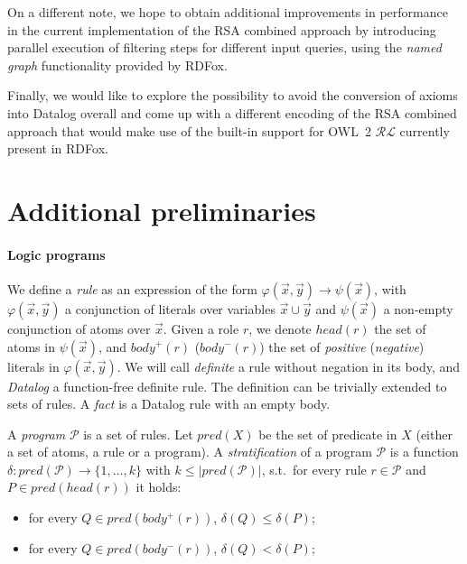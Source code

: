 \documentclass[runningheads]{llncs}
\newcommand{\rdfox}{\mbox{RDFox}\xspace}
\newcommand{\datalog}{\mbox{Datalog}\xspace}
\begin{document}
On a different note, we hope to obtain additional improvements in performance in the current implementation of the RSA combined approach by introducing parallel execution of filtering steps for different input queries, using the \emph{named graph} functionality provided by \rdfox.

Finally, we would like to explore the possibility to avoid the conversion of axioms into \datalog overall and come up with a different encoding of the RSA combined approach that would make use of the built-in support for OWL~2 $\mathcal{RL}$ currently present in \rdfox.
 




\appendix
\appendixpage

\section{Additional preliminaries}\label{apx:additional_preliminaries}
 
\paragraph*{Logic programs}

We define a \emph{rule} as an expression of the form $\varphi(\vec{x},\vec{y}) \rightarrow \psi(\vec{x})$, with $\varphi(\vec{x},\vec{y})$ a conjunction of literals over variables $\vec{x} \cup \vec{y}$ and $\psi(\vec{x})$ a non-empty conjunction of atoms over $\vec{x}$.
Given a role $r$, we denote $head(r)$ the set of atoms in $\psi(\vec{x})$, and $body^+(r)$ ($body^-(r)$) the set of \emph{positive} (\emph{negative}) literals in $\varphi(\vec{x},\vec{y})$.
We will call \emph{definite} a rule without negation in its body, and \emph{\datalog} a function-free definite rule.
The definition can be trivially extended to sets of rules.
A \emph{fact} is a \datalog rule with an empty body.

A \emph{program} $\mathcal{P}$ is a set of rules.
Let $pred(X)$ be the set of predicate in $X$ (either a set of atoms, a rule or a program).
A \emph{stratification} of a program $\mathcal{P}$ is a function $\delta: pred(\mathcal{P}) \rightarrow \{1,\dots,k\}$ with $k \le |pred(\mathcal{P})|$, s.t.\ for every rule $r \in \mathcal{P}$ and $P \in pred(head(r))$ it holds:
\begin{itemize}
    \item
        for every $Q \in pred(body^+(r))$, $\delta(Q) \le \delta(P)$;
    \item
        for every $Q \in pred(body^-(r))$, $\delta(Q) < \delta(P)$;
\end{itemize}
\end{document}
